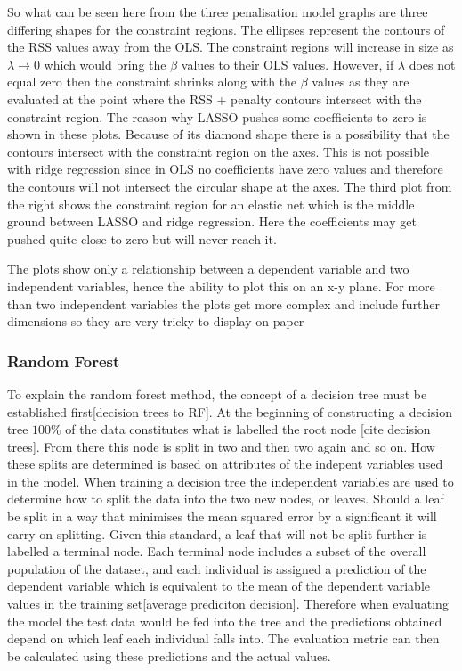 \documentclass[11pt]{article}
\begin{document}
So what can be seen here from the three penalisation model graphs are three differing shapes for the constraint regions. The ellipses represent the contours of the RSS values away from the OLS. The constraint regions will increase in size as \(\lambda \to 0\) which would bring the \(\beta\) values to their OLS values. However, if  \(\lambda\)  does not equal zero then the constraint shrinks along with the \(\beta\) values as they are evaluated at the point where the RSS + penalty contours intersect with the constraint region. The reason why LASSO pushes some coefficients to zero is shown in these plots. Because of its diamond shape there is a possibility that the contours intersect with the constraint region on the axes. This is not possible with ridge regression since in OLS no coefficients have zero values and therefore the contours will not intersect the circular shape at the axes. The third plot from the right shows the constraint region for an elastic net which is the middle ground between LASSO and ridge regression. Here the coefficients may get pushed quite close to zero but will never reach it.

The plots show only a relationship between a dependent variable and two independent variables, hence the ability to plot this on an x-y plane. For more than two independent variables the plots get more complex and include further dimensions so they are very tricky to display on paper

\subsubsection{Random Forest}
To explain the random forest method, the concept of a decision tree must be established first[decision trees to RF]. At the beginning of constructing a decision tree \(100\%\) of the data constitutes what is labelled the root node [cite decision trees]. From there this node is split in two and then two again and so on. How these splits are determined is based on attributes of the indepent variables used in the model. When training a decision tree the independent variables are used to determine how to split the data into the two new nodes, or leaves. Should a leaf be split in a way that minimises the mean squared error by a significant it will carry on splitting. Given this standard, a leaf that will not be split further is labelled a terminal node. Each terminal node includes a subset of the overall population of the dataset, and each individual is assigned a prediction of the dependent variable which is equivalent to the mean of the dependent variable values in the training set[average prediciton decision]. Therefore when evaluating the model the test data would be fed into the tree and the predictions obtained depend on which leaf each individual falls into. The evaluation metric can then be calculated using these predictions and the actual values.
\end{document}
